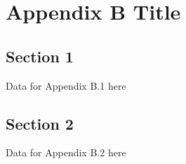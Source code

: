 \chapter{Appendix B Title}
\label{chp:appB}

\section{Section 1}
Data for Appendix B.1 here

\section{Section 2}
Data for Appendix B.2 here

